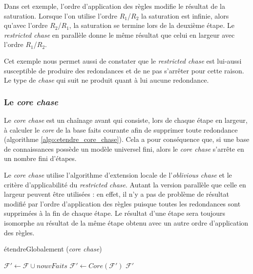 Dans cet exemple, l'ordre d'application des règles modifie le résultat de la saturation. Lorsque l'on utilise l'ordre $R_1$/$R_2$ la saturation est infinie, alors qu'avec l'ordre $R_2$/$R_1$, la saturation se termine lors de la deuxième étape. Le \textit{restricted chase} en parallèle donne le même résultat que celui en largeur avec l'ordre $R_1$/$R_2$.
\par Cet exemple nous permet aussi de constater que le \textit{restricted chase} est lui-aussi susceptible de produire des redondances et de ne pas s'arrêter pour cette raison. Le type de \textit{chase} qui suit ne produit quant à lui aucune redondance.

\subsubsection{Le \textit{core chase}}\label{sec:core_chase}

Le \textit{core chase} est un chaînage avant qui consiste, lors de chaque étape en largeur, à calculer le \textit{core} de la base faits courante afin de supprimer toute redondance (algorithme \ref{algo:etendre_core_chase}).
Cela a pour conséquence que, si une base de connaissances possède un modèle universel fini, alors le \textit{core chase} s'arrête en un nombre fini d'étapes.
\par Le \textit{core chase} utilise l'algorithme d'extension locale de l'\textit{oblivious chase} et le critère d'applicabilité du \textit{restricted chase}. Autant la version parallèle que celle en largeur peuvent être utilisées : en effet, il n'y a pas de problème de résultat modifié par l'ordre d'application des règles puisque toutes les redondances sont supprimées à la fin de chaque étape. Le résultat d'une étape sera toujours isomorphe au résultat de la même étape obtenu avec un autre ordre d'application des règles.

\begin{algorithm}[H]\label{algo:etendre_core_chase}
\caption{étendreGlobalement (\textit{core chase})}
\SetAlgoLined
\DontPrintSemicolon
\SetAlgoLined
\DontPrintSemicolon
{}
    $\mathcal{F'} \gets \mathcal{F} \cup nouvFaits$\;
    $\mathcal{F'} \gets Core(\mathcal{F'})$\;
    \Return $\mathcal{F'}$
\end{algorithm}

